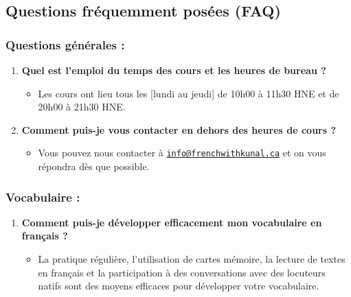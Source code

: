 \documentclass[
  16pt,
  letterpaper,
  DIV=11,
  numbers=noendperiod]{scrartcl}
\author{}
\date{}
\providecommand{\tightlist}{%
  \setlength{\itemsep}{0pt}\setlength{\parskip}{0pt}}\usepackage{longtable,booktabs,array}
\begin{document}
\subsection{Questions fréquemment posées
(FAQ)}\label{questions-fruxe9quemment-posuxe9es-faq}

\subsubsection{Questions générales :}\label{questions-guxe9nuxe9rales}

\begin{enumerate}
\def\labelenumi{\arabic{enumi}.}
\tightlist
\item
  \textbf{Quel est l'emploi du temps des cours et les heures de bureau
  ?}

  \begin{itemize}
  \tightlist
  \item
    Les cours ont lieu tous les {[}lundi au jeudi{]} de 10h00 à 11h30
    HNE et de 20h00 à 21h30 HNE.
  \end{itemize}
\item
  \textbf{Comment puis-je vous contacter en dehors des heures de cours
  ?}

  \begin{itemize}
  \tightlist
  \item
    Vous pouvez nous contacter à
    \href{mailto:info@frenchwithkunal.ca}{\nolinkurl{info@frenchwithkunal.ca}}
    et on vous répondra dès que possible.
  \end{itemize}
\end{enumerate}

\subsubsection{Vocabulaire :}\label{vocabulaire}

\begin{enumerate}
\def\labelenumi{\arabic{enumi}.}
\setcounter{enumi}{2}
\tightlist
\item
  \textbf{Comment puis-je développer efficacement mon vocabulaire en
  français ?}

  \begin{itemize}
  \tightlist
  \item
    La pratique régulière, l'utilisation de cartes mémoire, la lecture
    de textes en français et la participation à des conversations avec
    des locuteurs natifs sont des moyens efficaces pour développer votre
    vocabulaire.
  \end{itemize}
\end{enumerate}
\end{document}
